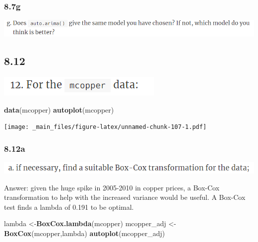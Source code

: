\documentclass[]{book}
\newenvironment{Shaded}{\begin{snugshade}}{\end{snugshade}}
\newcommand{\KeywordTok}[1]{\textcolor[rgb]{0.13,0.29,0.53}{\textbf{#1}}}
\newcommand{\NormalTok}[1]{#1}
\newcommand{\StringTok}[1]{\textcolor[rgb]{0.31,0.60,0.02}{#1}}
\begin{document}
\hypertarget{g-2}{%
\subsubsection{8.7g}\label{g-2}}

\includegraphics{./week5/8.7g.png}

\hypertarget{section-15}{%
\subsection{8.12}\label{section-15}}

\includegraphics{./week5/8.12.png}

\begin{Shaded}
\begin{Highlighting}[]
\KeywordTok{data}\NormalTok{(mcopper)}
\KeywordTok{autoplot}\NormalTok{(mcopper)}
\end{Highlighting}
\end{Shaded}

\texttt{[image: \_main\_files/figure-latex/unnamed-chunk-107-1.pdf]}

\hypertarget{a-9}{%
\subsubsection{8.12a}\label{a-9}}

\includegraphics{./week5/8.12a.png}

Answer: given the huge spike in 2005-2010 in copper prices, a Box-Cox transformation to help with the increased variance would be useful. A Box-Cox test finds a lambda of 0.191 to be optimal.

\begin{Shaded}
\begin{Highlighting}[]
\NormalTok{lambda <-}\KeywordTok{BoxCox.lambda}\NormalTok{(mcopper)}
\NormalTok{mcopper_adj <-}\StringTok{ }\KeywordTok{BoxCox}\NormalTok{(mcopper,lambda)}
\KeywordTok{autoplot}\NormalTok{(mcopper_adj)}
\end{Highlighting}
\end{Shaded}
\end{document}
